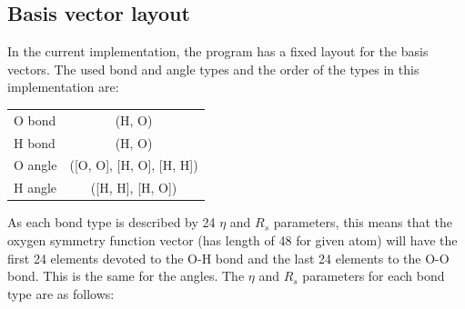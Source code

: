 \documentclass{article}
\begin{document}
\subsection{Basis vector layout}
In the current implementation, the program has a fixed layout for the basis vectors. The used bond and angle types and the order of the types in this implementation are:

\begin{center}
\begin{tabular}{| l | c |}
\hline
O bond & (H, O) \\
H bond & (H, O) \\
O angle & ([O, O], [H, O], [H, H]) \\
H angle & ([H, H], [H, O])\\
\hline
\end{tabular} 
\end{center}

As each bond type is described by 24 $\eta$ and $R_s$ parameters, this means that the oxygen symmetry function vector (has length of 48 for given atom) will have the first 24 elements devoted to the O-H bond and the last 24 elements to the O-O bond. This is the same for the angles. The $\eta$ and $R_s$ parameters for each bond type are as follows:
\end{document}

